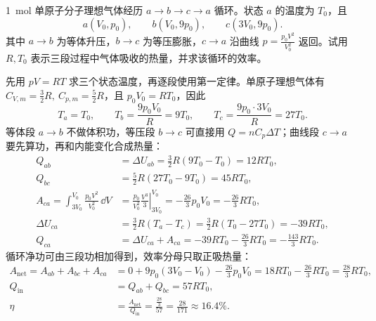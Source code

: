 \begin{exercise}[2015-2016期末：单原子气体沿抛物线回到初态的循环效率]
\SI{1}{mol} 单原子分子理想气体经历 \(a\to b\to c\to a\) 循环。状态 \(a\) 的温度为 \(T_0\)，且
\[
a(V_0,p_0),\qquad b(V_0,9p_0),\qquad c(3V_0,9p_0).
\]
其中 \(a\to b\) 为等体升压，\(b\to c\) 为等压膨胀，\(c\to a\) 沿曲线
 \(p=\frac{p_0V^2}{V_0^2}\) 
返回。试用 \(R,T_0\) 表示三段过程中气体吸收的热量，并求该循环的效率。
\end{exercise}

\begin{solution}
先用 \(pV=RT\) 求三个状态温度，再逐段使用第一定律。单原子理想气体有 \(C_{V,m}=\frac32R,\ C_{p,m}=\frac52R\)，且 \(p_0V_0=RT_0\)，因此
 \[T_a=T_0,\qquad T_b=\frac{9p_0V_0}{R}=9T_0,\qquad T_c=\frac{9p_0\cdot3V_0}{R}=27T_0.\]
等体段 \(a\to b\) 不做体积功，等压段 \(b\to c\) 可直接用 \(Q=nC_p\Delta T\)；曲线段 \(c\to a\) 要先算功，再和内能变化合成热量：
\[
\begin{aligned}
Q_{ab}&=\Delta U_{ab}
=\frac32R(9T_0-T_0)
=12RT_0,\\
Q_{bc}&=\frac52R(27T_0-9T_0)
=45RT_0,\\
A_{ca}=\int_{3V_0}^{V_0}\frac{p_0V^2}{V_0^2}\,\dd V
&=\frac{p_0}{V_0^2}\left.\frac{V^3}{3}\right|_{3V_0}^{V_0}
=-\frac{26}{3}p_0V_0
=-\frac{26}{3}RT_0,\\
\Delta U_{ca}&=\frac32R(T_a-T_c)
=\frac32R(T_0-27T_0)
=-39RT_0,\\
Q_{ca}&=\Delta U_{ca}+A_{ca}
=-39RT_0-\frac{26}{3}RT_0
=-\frac{143}{3}RT_0.
\end{aligned}
\]
循环净功可由三段功相加得到，效率分母只取正吸热量：
\[
\begin{aligned}
A_{\text{net}}=A_{ab}+A_{bc}+A_{ca}
&=0+9p_0(3V_0-V_0)-\frac{26}{3}p_0V_0=18RT_0-\frac{26}{3}RT_0
=\frac{28}{3}RT_0,\\
Q_{\text{in}}&=Q_{ab}+Q_{bc}=57RT_0,\\
\eta&=\frac{A_{\text{net}}}{Q_{\text{in}}}
=\frac{\frac{28}{3}}{57}
=\frac{28}{171}
\approx16.4\%.
\end{aligned}
\]
\end{solution}


